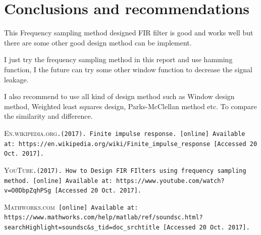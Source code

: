 \documentclass[titlepage]{article}
\begin{document}
\section{Conclusions and recommendations}
\label{sec:org85caf75}
This Frequency sampling method designed FIR filter is good and works well but
there are some other good design method can be implement.

I just try the frequency sampling method in this report and use hamming
function, I the future can try some other window function to decrease the
signal leakage.

I also recommend to use all kind of design method such as Window design
method, Weighted least squares design, Parks-McClellan method etc. To compare
the similarity and difference.




  \begin{thebibliography}{99}

  \textsc{En.wikipedia.org}\texttt{.(2017). Finite impulse response. [online] Available at:
  https://en.wikipedia.org/wiki/Finite_impulse_response
[Accessed 20 Oct. 2017].}

  \textsc{YouTube}\texttt{.(2017). How to Design FIR FIlters using frequency sampling method.
[online] Available at: https://www.youtube.com/watch?v=O0DbpZqhPSg [Accessed 20 Oct. 2017].}

  \textsc{Mathworks.com}\texttt{
[online] Available at: https://www.mathworks.com/help/matlab/ref/soundsc.html?searchHighlight=soundsc&s_tid=doc_srchtitle [Accessed 20 Oct. 2017].}

\end{thebibliography}
\end{document}
